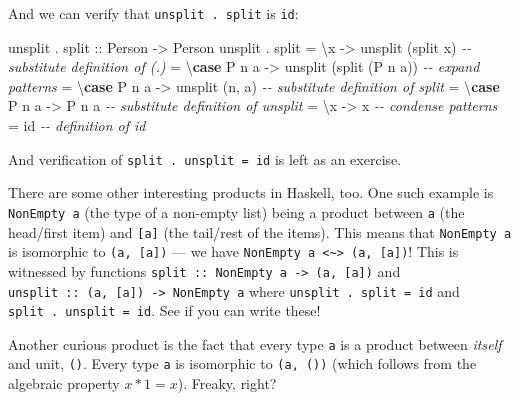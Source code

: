 \documentclass[]{article}
\newenvironment{Shaded}{}{}
\newcommand{\CommentTok}[1]{\textcolor[rgb]{0.38,0.63,0.69}{\textit{#1}}}
\newcommand{\DataTypeTok}[1]{\textcolor[rgb]{0.56,0.13,0.00}{#1}}
\newcommand{\FunctionTok}[1]{\textcolor[rgb]{0.02,0.16,0.49}{#1}}
\newcommand{\KeywordTok}[1]{\textcolor[rgb]{0.00,0.44,0.13}{\textbf{#1}}}
\newcommand{\NormalTok}[1]{#1}
\newcommand{\OperatorTok}[1]{\textcolor[rgb]{0.40,0.40,0.40}{#1}}
\newcommand{\OtherTok}[1]{\textcolor[rgb]{0.00,0.44,0.13}{#1}}
\begin{document}
And we can verify that \texttt{unsplit\ .\ split} is \texttt{id}:

\begin{Shaded}
\begin{Highlighting}[]
\NormalTok{unsplit }\OperatorTok{.}\OtherTok{ split ::} \DataTypeTok{Person} \OtherTok{{-}>} \DataTypeTok{Person}
\NormalTok{unsplit }\OperatorTok{.}\NormalTok{ split}
    \OtherTok{=}\NormalTok{ \textbackslash{}x          }\OtherTok{{-}>}\NormalTok{ unsplit (split x)        }\CommentTok{{-}{-} substitute definition of (.)}
    \OtherTok{=}\NormalTok{ \textbackslash{}}\KeywordTok{case} \DataTypeTok{P}\NormalTok{ n a }\OtherTok{{-}>}\NormalTok{ unsplit (split (}\DataTypeTok{P}\NormalTok{ n a))  }\CommentTok{{-}{-} expand patterns}
    \OtherTok{=}\NormalTok{ \textbackslash{}}\KeywordTok{case} \DataTypeTok{P}\NormalTok{ n a }\OtherTok{{-}>}\NormalTok{ unsplit (n, a)           }\CommentTok{{-}{-} substitute definition of split}
    \OtherTok{=}\NormalTok{ \textbackslash{}}\KeywordTok{case} \DataTypeTok{P}\NormalTok{ n a }\OtherTok{{-}>} \DataTypeTok{P}\NormalTok{ n a                    }\CommentTok{{-}{-} substitute definition of unsplit}
    \OtherTok{=}\NormalTok{ \textbackslash{}x      }\OtherTok{{-}>}\NormalTok{ x                            }\CommentTok{{-}{-} condense patterns}
    \OtherTok{=} \FunctionTok{id}                                      \CommentTok{{-}{-} definition of id}
\end{Highlighting}
\end{Shaded}

And verification of \texttt{split\ .\ unsplit\ =\ id} is left as an exercise.

There are some other interesting products in Haskell, too. One such example is
\texttt{NonEmpty\ a} (the type of a non-empty list) being a product between
\texttt{a} (the head/first item) and \texttt{{[}a{]}} (the tail/rest of the
items). This means that \texttt{NonEmpty\ a} is isomorphic to
\texttt{(a,\ {[}a{]})} --- we have
\texttt{NonEmpty\ a\ \textless{}\textasciitilde{}\textgreater{}\ (a,\ {[}a{]})}!
This is witnessed by functions
\texttt{split\ ::\ NonEmpty\ a\ -\textgreater{}\ (a,\ {[}a{]})} and
\texttt{unsplit\ ::\ (a,\ {[}a{]})\ -\textgreater{}\ NonEmpty\ a} where
\texttt{unsplit\ .\ split\ =\ id} and \texttt{split\ .\ unsplit\ =\ id}. See if
you can write these!

Another curious product is the fact that every type \texttt{a} is a product
between \emph{itself} and unit, \texttt{()}. Every type \texttt{a} is isomorphic
to \texttt{(a,\ ())} (which follows from the algebraic property \(x * 1 = x\)).
Freaky, right?
\end{document}
